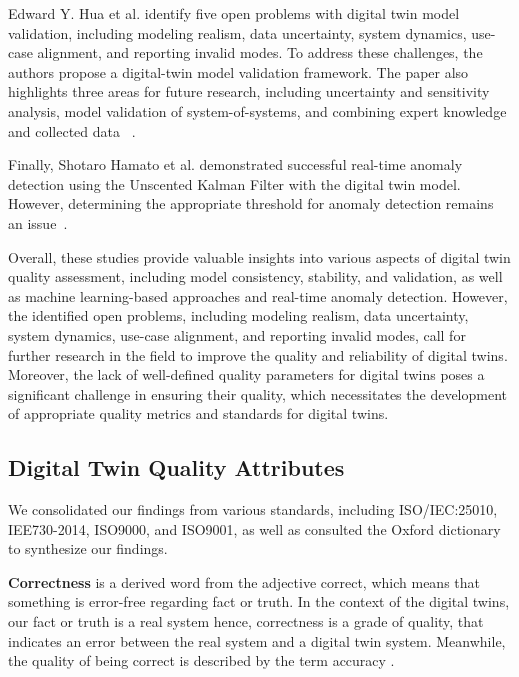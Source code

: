\documentclass{llncs}
\begin{document}
    Edward Y. Hua et al. identify five open problems with digital twin model validation, including modeling realism, data uncertainty, system dynamics, use-case alignment, and reporting invalid modes. To address these challenges, the authors propose a digital-twin model validation framework. The paper also highlights three areas for future research, 
    including uncertainty and sensitivity analysis, model validation of system-of-systems, and combining expert knowledge and collected data ~\cite{ValidationofDigitalTwins}. 

    Finally, Shotaro Hamato et al. demonstrated successful real-time anomaly detection using the Unscented Kalman Filter with the digital twin model. 
    However, determining the appropriate threshold for anomaly detection remains an issue~\cite{JapeneseKalmanFilterCorrectness}.

    Overall, these studies provide valuable insights into various aspects of digital twin quality assessment, 
    including model consistency, stability, and validation, as well as machine learning-based approaches and real-time anomaly detection. 
    However, the identified open problems, including modeling realism, data uncertainty, system dynamics, use-case alignment, and reporting invalid modes, 
    call for further research in the field to improve the quality and reliability of digital twins. Moreover, 
    the lack of well-defined quality parameters for digital twins poses a significant challenge in ensuring their quality,
    which necessitates the development of appropriate quality metrics and standards for digital twins.
    \subsection{Digital Twin Quality Attributes}
    We consolidated our findings from various standards, including ISO/IEC:25010, IEE730-2014, ISO9000, and ISO9001, as well as consulted the  Oxford dictionary to 
    synthesize our findings\cite{ISO9000,ISO90012015,ISO/IEC:25010,IEE730-2014, OxfordDictionary}.
    
    \textbf{Correctness} is a  derived word from the adjective correct, which means that something is error-free regarding fact or truth. In the context of the digital twins, our fact or truth is a real system hence, correctness is a grade of quality, that indicates an error between the real system and a digital twin system.
    Meanwhile, the quality of being correct is described by the term accuracy \cite{OxfordDictionary}. 
    
\end{document}
